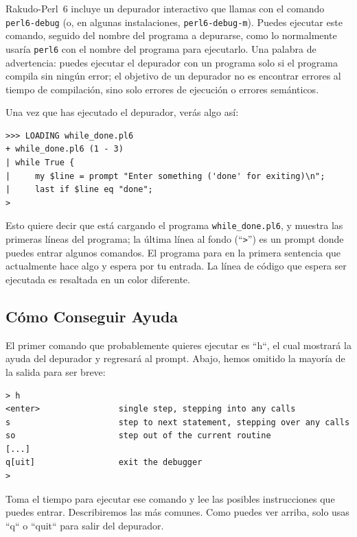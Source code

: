 Rakudo-Perl~6 incluye un depurador interactivo que 
llamas con el comando {\tt perl6-debug} (o, en algunas
instalaciones, {\tt perl6-debug-m}). Puedes ejecutar este 
comando, seguido del nombre del programa a depurarse, como
lo normalmente usaría {\tt perl6} con el nombre del programa
para ejecutarlo. Una palabra de advertencia: puedes ejecutar
el depurador con un programa solo si el programa
compila sin ningún error; el objetivo de un depurador no es encontrar 
errores al tiempo de compilación, sino solo errores de
ejecución o errores semánticos.

Una vez que has ejecutado el depurador, verás algo así:

\begin{verbatim}
>>> LOADING while_done.pl6
+ while_done.pl6 (1 - 3)
| while True {
|     my $line = prompt "Enter something ('done' for exiting)\n";
|     last if $line eq "done";
>
\end{verbatim}

Esto quiere decir que está cargando el programa \verb|while_done.pl6|,
y muestra las primeras líneas del programa; la última línea al fondo
(``\verb">"'')  es un prompt donde puedes entrar algunos comandos.
El programa para en la primera sentencia que actualmente hace algo y espera
por tu entrada. La línea de código que espera ser ejecutada
es resaltada en un color diferente.

\subsection{Cómo Conseguir Ayuda}

El primer comando que probablemente quieres ejecutar es ``h``,
el cual mostrará la ayuda del depurador y regresará al 
prompt. Abajo, hemos omitido la mayoría de la salida
para ser breve:

\begin{verbatim}
> h
<enter>                single step, stepping into any calls
s                      step to next statement, stepping over any calls
so                     step out of the current routine
[...]
q[uit]                 exit the debugger
>
\end{verbatim}

Toma el tiempo para ejecutar ese comando y lee 
las posibles instrucciones que puedes entrar.
Describiremos las más comunes. Como puedes ver arriba,
solo usas ``q`` o ``quit`` para salir del depurador.

